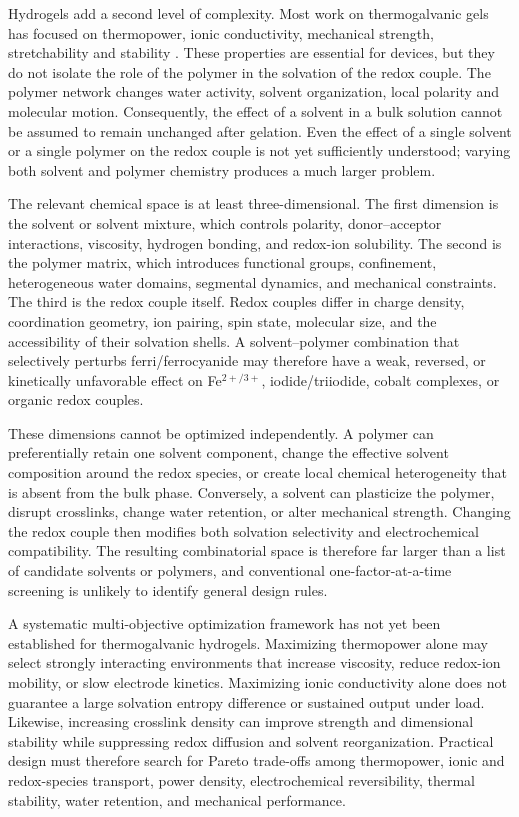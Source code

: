 \documentclass[a4paper,12pt]{report}
\begin{document}
Hydrogels add a second level of complexity. Most work on thermogalvanic gels
has focused on thermopower, ionic conductivity, mechanical strength,
stretchability and stability \citep{yang2023strong,gao2022anisotropic}.
These properties are essential for devices, but they do not isolate the role of
the polymer in the solvation of the redox couple. The polymer network changes
water activity, solvent organization, local polarity and molecular motion.
Consequently, the effect of a solvent in a bulk solution cannot be assumed to
remain unchanged after gelation. Even the effect of a single solvent or a
single polymer on the redox couple is not yet sufficiently understood; varying
both solvent and polymer chemistry produces a much larger problem.

The relevant chemical space is at least three-dimensional. The first dimension
is the solvent or solvent mixture, which controls polarity, donor--acceptor
interactions, viscosity, hydrogen bonding, and redox-ion solubility. The second
is the polymer matrix, which introduces functional groups, confinement,
heterogeneous water domains, segmental dynamics, and mechanical constraints.
The third is the redox couple itself. Redox couples differ in charge density,
coordination geometry, ion pairing, spin state, molecular size, and the
accessibility of their solvation shells. A solvent--polymer combination that
selectively perturbs ferri/ferrocyanide may therefore have a weak, reversed, or
kinetically unfavorable effect on Fe$^{2+/3+}$, iodide/triiodide, cobalt
complexes, or organic redox couples.

These dimensions cannot be optimized independently. A polymer can preferentially
retain one solvent component, change the effective solvent composition around
the redox species, or create local chemical heterogeneity that is absent from
the bulk phase. Conversely, a solvent can plasticize the polymer, disrupt
crosslinks, change water retention, or alter mechanical strength. Changing the
redox couple then modifies both solvation selectivity and electrochemical
compatibility. The resulting combinatorial space is therefore far larger than
a list of candidate solvents or polymers, and conventional one-factor-at-a-time
screening is unlikely to identify general design rules.

A systematic multi-objective optimization framework has not yet been
established for thermogalvanic hydrogels. Maximizing thermopower alone may
select strongly interacting environments that increase viscosity, reduce
redox-ion mobility, or slow electrode kinetics. Maximizing ionic conductivity
alone does not guarantee a large solvation entropy difference or sustained
output under load. Likewise, increasing crosslink density can improve strength
and dimensional stability while suppressing redox diffusion and solvent
reorganization. Practical design must therefore search for Pareto trade-offs
among thermopower, ionic and redox-species transport, power density,
electrochemical reversibility, thermal stability, water retention, and
mechanical performance.
\end{document}
